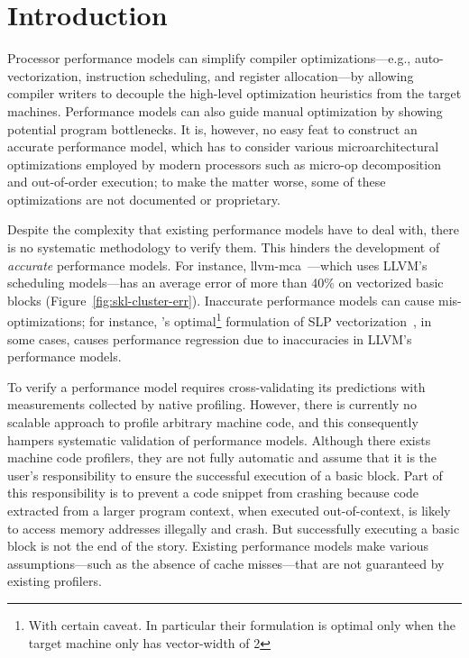 \section{Introduction}

Processor performance models can simplify compiler optimizations---e.g.,
auto-vectorization, instruction scheduling, and register allocation---by
allowing compiler writers to decouple the high-level optimization
heuristics from the target machines.
Performance models can also guide manual optimization by showing
potential program bottlenecks.
It is, however, no easy feat to construct an accurate performance model,
which has to consider various microarchitectural optimizations employed by
modern processors such as micro-op decomposition and out-of-order execution;
to make the matter worse, some of these optimizations 
are not documented or proprietary.

Despite the complexity that existing performance models have to deal with,
there is no systematic methodology to verify them. 
This hinders the development of \emph{accurate} performance models.
For instance, llvm-mca~\cite{llvm-mca}---which uses 
LLVM's scheduling models---has an average error of more than 40\% on vectorized
basic blocks (Figure~\ref{fig:skl-cluster-err}).
Inaccurate performance models can cause mis-optimizations;
for instance, \cite{goslp}'s optimal\footnote{
With certain caveat.
In particular their formulation is optimal only when the target machine only has vector-width of 2} 
formulation of SLP vectorization~\cite{slp},
in some cases, causes performance regression due to inaccuracies in LLVM's~\cite{llvm} performance models.


To verify a performance model
requires cross-validating its predictions with
measurements collected by native profiling.
However, there is currently no scalable approach 
to profile arbitrary machine code, and this consequently
hampers systematic validation of performance models.
Although there exists machine code profilers, 
they are not fully automatic and
assume that it is the user's responsibility to ensure
the successful execution of a basic block.
Part of this responsibility is to prevent a code snippet from crashing because 
code extracted from a larger program context, when executed
out-of-context, is likely to access memory addresses illegally and crash.
But successfully executing a basic block is not the end of the story.
Existing performance models make various assumptions---such as the absence of
cache misses---that are not guaranteed by existing profilers.

